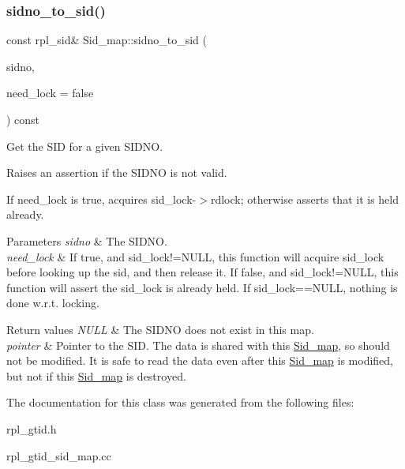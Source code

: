 \subsubsection{\texorpdfstring{sidno\+\_\+to\+\_\+sid()}{sidno\_to\_sid()}}
{\footnotesize\ttfamily const rpl\+\_\+sid\& Sid\+\_\+map\+::sidno\+\_\+to\+\_\+sid (\begin{DoxyParamCaption}\item[{rpl\+\_\+sidno}]{sidno,  }\item[{bool}]{need\+\_\+lock = {\ttfamily false} }\end{DoxyParamCaption}) const\hspace{0.3cm}{\ttfamily [inline]}}

Get the S\+ID for a given S\+I\+D\+NO.

Raises an assertion if the S\+I\+D\+NO is not valid.

If need\+\_\+lock is true, acquires sid\+\_\+lock-\/$>$rdlock; otherwise asserts that it is held already.


\begin{DoxyParams}{Parameters}
{\em sidno} & The S\+I\+D\+NO. \\
\hline
{\em need\+\_\+lock} & If true, and sid\+\_\+lock!=N\+U\+LL, this function will acquire sid\+\_\+lock before looking up the sid, and then release it. If false, and sid\+\_\+lock!=N\+U\+LL, this function will assert the sid\+\_\+lock is already held. If sid\+\_\+lock==N\+U\+LL, nothing is done w.\+r.\+t. locking. \\
\hline
\end{DoxyParams}

\begin{DoxyRetVals}{Return values}
{\em N\+U\+LL} & The S\+I\+D\+NO does not exist in this map. \\
\hline
{\em pointer} & Pointer to the S\+ID. The data is shared with this \mbox{\hyperlink{classSid__map}{Sid\+\_\+map}}, so should not be modified. It is safe to read the data even after this \mbox{\hyperlink{classSid__map}{Sid\+\_\+map}} is modified, but not if this \mbox{\hyperlink{classSid__map}{Sid\+\_\+map}} is destroyed. \\
\hline
\end{DoxyRetVals}


The documentation for this class was generated from the following files\+:\begin{DoxyCompactItemize}
\item 
rpl\+\_\+gtid.\+h\item 
rpl\+\_\+gtid\+\_\+sid\+\_\+map.\+cc\end{DoxyCompactItemize}

